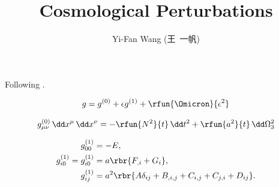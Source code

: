 \documentclass[a4paper,11pt]{article}
\title{Cosmological Perturbations}
\author{Yi-Fan Wang (王\ 一帆)}
\begin{document}
\maketitle

Following \cite[ch.~5]{Weinberg2008}.

\begin{align}
g = g^{(0)} + \epsilon g^{(1)} + \rfun{\Omicron}{\epsilon^2}
\end{align}

\begin{align}
g^{(0)}_{\mu\nu}\,\dd x^\mu\,\dd x^\nu =
-\rfun{N^2}{t}\,\dd t^2 + \rfun{a^2}{t}\,\dd \Omega_3^2
\end{align}

\begin{align}
g^{(1)}_{00} &= -E, \\
g^{(1)}_{i0} = g^{(1)}_{i0} &= a\rbr{F_{,i}+G_i}, \\
g^{(1)}_{ij} &= a^2\rbr{A \delta_{ij} + B_{,i,j}+C_{i,j}+C_{j,i}+D_{ij}}.
\end{align}

\printbibliography
\end{document}
